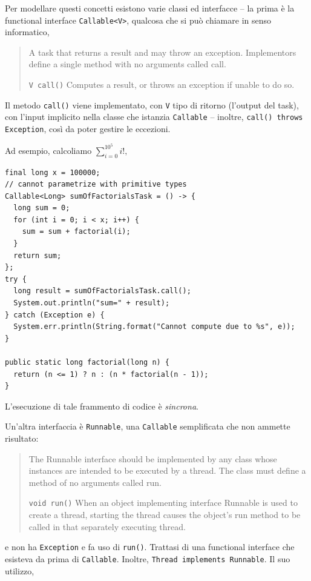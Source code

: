 \documentclass[\fontsizeclass,twocolumn]{\classname}
\theoremstyle{definition}
\theoremstyle{definition}
\begin{document}
Per modellare questi concetti esistono varie classi ed interfacce -- la prima è
la functional interface \texttt{Callable<V>}, qualcosa che si può chiamare in
senso informatico,
\begin{quote}
    \footnotesize{A task that returns a result and may throw an exception. Implementors define a single method with no arguments called call.

    \texttt{V 	call()} 	Computes a result, or throws an exception if unable to do so.}
\end{quote}

Il metodo \texttt{call()} viene implementato, con \texttt{V} tipo di ritorno
(l'output del task), con l'input implicito nella classe che istanzia
\texttt{Callable} -- inoltre, \texttt{call() throws Exception}, così da poter
gestire le eccezioni.

Ad esempio, calcoliamo $\displaystyle \sum_{i=0}^{10^5} i!,$

\begin{lstlisting}
final long x = 100000;
// cannot parametrize with primitive types
Callable<Long> sumOfFactorialsTask = () -> {
  long sum = 0;
  for (int i = 0; i < x; i++) {
    sum = sum + factorial(i);
  }
  return sum;
};
try {
  long result = sumOfFactorialsTask.call();
  System.out.println("sum=" + result);
} catch (Exception e) {
  System.err.println(String.format("Cannot compute due to %s", e));
}

public static long factorial(long n) {
  return (n <= 1) ? n : (n * factorial(n - 1));
}
\end{lstlisting}

L'esecuzione di tale frammento di codice è \emph{sincrona}.

Un'altra interfaccia è \texttt{Runnable}, una \texttt{Callable} semplificata
che non ammette risultato:
\begin{quote}
    \footnotesize{The Runnable interface should be implemented by any class whose instances are intended to be executed by a thread. The class must define a method of no arguments called run.

    \texttt{void 	run()} 	When an object implementing interface Runnable is used to create a thread, starting the thread causes the object's run method to be called in that separately executing thread.}
\end{quote}

e non ha \texttt{Exception} e fa uso di \texttt{run()}. Trattasi di una
functional interface che esisteva da prima di \texttt{Callable}. Inoltre,
\texttt{Thread implements Runnable}. Il suo utilizzo,
\end{document}
